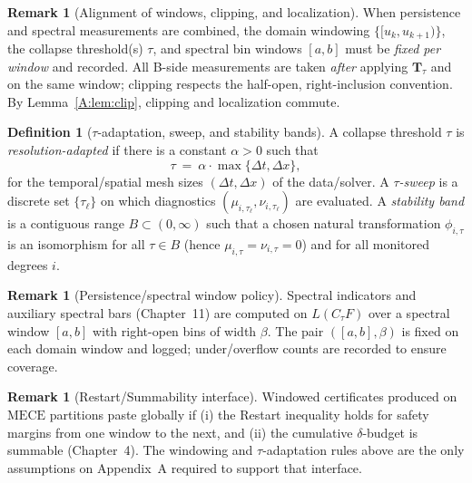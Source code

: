 \documentclass[11pt]{article}
\numberwithin{equation}{section}
\theoremstyle{plain}
\theoremstyle{definition}
\theoremstyle{remark}
\theoremstyle{plain}
\theoremstyle{definition}
\numberwithin{equation}{section}
\theoremstyle{definition}
\newtheorem{definition}[theorem]{Definition}
\newtheorem{remark}[theorem]{Remark}
\numberwithin{equation}{section}
\theoremstyle{plain}
\theoremstyle{definition}
\theoremstyle{remark}
\newcommand{\MECE}{\mathrm{MECE}}
\begin{document}
\begin{remark}[Alignment of windows, clipping, and localization]
When persistence and spectral measurements are combined, the domain windowing \(\{[u_k,u_{k+1})\}\), the collapse threshold(s) \(\tau\), and spectral bin windows \([a,b]\) must be \emph{fixed per window} and recorded. All B-side measurements are taken \emph{after} applying \(\mathbf{T}_\tau\) and on the same window; clipping respects the half-open, right-inclusion convention. By Lemma~\ref{A:lem:clip}, clipping and localization commute.
\end{remark}

\begin{definition}[\(\tau\)-adaptation, sweep, and stability bands]\label{A:def:tau-adapt}
A collapse threshold \(\tau\) is \emph{resolution-adapted} if there is a constant \(\alpha>0\) such that
\[
\tau\ =\ \alpha\cdot \max\{\Delta t,\Delta x\},
\]
for the temporal/spatial mesh sizes \((\Delta t,\Delta x)\) of the data/solver. A \emph{\(\tau\)-sweep} is a discrete set \(\{\tau_\ell\}\) on which diagnostics \((\mu_{i,\tau_\ell},\nu_{i,\tau_\ell})\) are evaluated. A \emph{stability band} is a contiguous range \(B\subset (0,\infty)\) such that a chosen natural transformation \(\phi_{i,\tau}\) is an isomorphism for all \(\tau\in B\) (hence \(\mu_{i,\tau}=\nu_{i,\tau}=0\)) and for all monitored degrees \(i\).
\end{definition}

\begin{remark}[Persistence/spectral window policy]
Spectral indicators and auxiliary spectral bars (Chapter~11) are computed on \(L(C_\tau F)\) over a spectral window \([a,b]\) with right-open bins of width \(\beta\). The pair \(([a,b],\beta)\) is fixed on each domain window and logged; under/overflow counts are recorded to ensure coverage.
\end{remark}

\begin{remark}[Restart/Summability interface]
Windowed certificates produced on \(\MECE\) partitions paste globally if (i) the Restart inequality holds for safety margins from one window to the next, and (ii) the cumulative \(\delta\)-budget is summable (Chapter~4). The windowing and \(\tau\)-adaptation rules above are the only assumptions on Appendix~A required to support that interface.
\end{remark}

\end{document}
